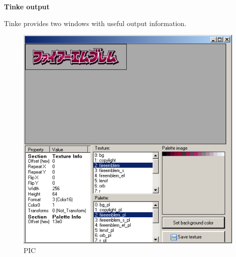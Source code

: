 \documentclass[
]{book}
\begin{document}
\textbf{Tinke output}

Tinke provides two windows with useful output information.

\begin{figure}
\centering
\includegraphics{images/70_home_fast6191_romhackingguide_unrenamed_file___gguidegraphics3dminorNSMBDtexturedecoding_2.png}
\caption{PIC}
\end{figure}
\end{document}
